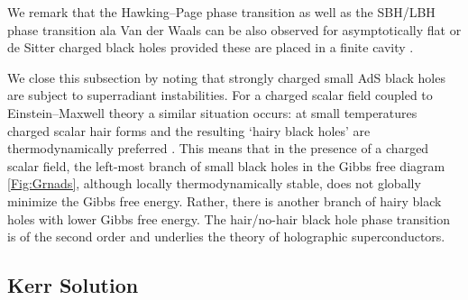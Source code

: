 We remark that the Hawking--Page phase transition as well as the SBH/LBH phase transition ala Van der Waals can be also observed for asymptotically flat or de Sitter charged black holes provided these are placed in a finite cavity \cite{Carlip:2003ne}.  



We close this subsection by noting that strongly charged small AdS black holes are subject to superradiant instabilities. For a charged scalar field coupled to Einstein--Maxwell theory a similar situation occurs:  
at small temperatures  charged scalar hair forms and the resulting `hairy black holes' are thermodynamically preferred  \cite{Gubser:2008px, Hartnoll:2008vx, Hartnoll:2008kx, Maeda:2010hf, Basu:2010uz, Dias:2011tj, Horowitz:2010gk, Hartmann:2013nla}. This means that in the presence of a charged scalar field, the left-most branch of small black holes in the Gibbs free diagram \ref{Fig:Grnads}, although locally thermodynamically stable, does not globally minimize the Gibbs free energy. Rather, there is another branch of hairy black holes with 
lower Gibbs free energy. The hair/no-hair black hole phase transition is of the second order and underlies the theory of holographic superconductors.   

  

 \subsection{Kerr Solution}
 
